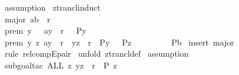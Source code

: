 \begin{isabellebody}
\ {\isacharparenleft}assumption{\isacharparenright}{\isacharplus}\isanewline
{}\isamarkupfalse%
%
\endisatagproof
{\isafoldproof}%
%
\isadelimproof
\isanewline
%
\endisadelimproof
\isanewline
\isanewline
{}\isamarkupfalse%
\ ztrancl{\isacharunderscore}induct{\isacharcolon}\isanewline
{}\ major{\isacharcolon}\ {\isachardoublequoteopen}{\isacharparenleft}a{\isacharcomma}b{\isacharparenright}\ {\isacharcolon}\ r{\isacharpercent}{\isacharplus}{\isachardoublequoteclose}\ \ \ \ \ \ \ \ \ \ \ \ \ \ \ \ \ \ \ \ \ \ \ \ \ \ \ \ \ \ \ \ \ \ \ \ \ \ \isanewline
{}\ prem{}{\isacharcolon}\ {\isachardoublequoteopen}{\isacharbang}{\isacharbang}y{\isachardot}\ \ {\isacharbrackleft}{\isacharbar}\ {\isacharparenleft}a{\isacharcomma}y{\isacharparenright}\ {\isacharcolon}\ r\ {\isacharbar}{\isacharbrackright}\ {\isacharequal}{\isacharequal}{\isachargreater}\ P{\isacharparenleft}y{\isacharparenright}{\isachardoublequoteclose}\ \ \ \ \ \ \ \ \ \ \ \ \ \ \ \ \ \ \isanewline
{}\ prem{}{\isacharcolon}\ {\isachardoublequoteopen}{\isacharbang}{\isacharbang}y\ z{\isachardot}{\isacharbrackleft}{\isacharbar}\ {\isacharparenleft}a{\isacharcomma}y{\isacharparenright}\ {\isacharcolon}\ r{\isacharpercent}{\isacharplus}{\isacharsemicolon}\ \ {\isacharparenleft}y{\isacharcomma}z{\isacharparenright}\ {\isacharcolon}\ r{\isacharsemicolon}\ \ P{\isacharparenleft}y{\isacharparenright}\ {\isacharbar}{\isacharbrackright}\ {\isacharequal}{\isacharequal}{\isachargreater}\ P{\isacharparenleft}z{\isacharparenright}{\isachardoublequoteclose}\ \ \ \ \ \ \ \ \isanewline
{}\ {\isachardoublequoteopen}P{\isacharparenleft}b{\isacharparenright}{\isachardoublequoteclose}\isanewline
%
\isadelimproof
%
\endisadelimproof
%
\isatagproof
{}\isamarkupfalse%
\ {\isacharparenleft}insert\ major{\isacharparenright}\isanewline
{}\isamarkupfalse%
\ {\isacharparenleft}rule\ rel{\isacharunderscore}compEpair{\isacharparenright}\isanewline
{}\isamarkupfalse%
\ {\isacharparenleft}unfold\ ztrancl{\isacharunderscore}def{\isacharparenright}\isanewline
{}\isamarkupfalse%
\ assumption\isanewline
\isanewline
{}\isamarkupfalse%
\ {\isacharparenleft}subgoal{\isacharunderscore}tac\ {\isachardoublequoteopen}ALL\ z{\isachardot}\ {\isacharparenleft}y{\isacharcomma}z{\isacharparenright}\ {\isacharcolon}\ r\ {\isacharminus}{\isacharminus}{\isachargreater}\ P\ {\isacharparenleft}z{\isacharparenright}\ {\isachardoublequoteclose}{\isacharparenright}\isanewline

\end{isabellebody}
